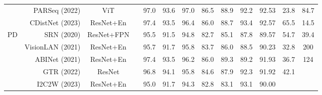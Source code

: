 \documentclass[10pt,journal,compsoc]{IEEEtran}
\begin{document}
\begin{table*}[t]
{\begin{tabular}{c|r|c|c|ccc|ccc|c|cc}
                        & PARSeq  \cite{BautistaA22PARSeq} (2022)  & ViT        &         & 97.0          & 93.6          & 97.0 & 86.5          & 88.9          & 92.2          & 92.53                                                                       & 23.8                                                                    & 84.7     \\
                        & CDistNet  \cite{zheng2023cdistnet} (2023)  & ResNet+En        &         & 97.4          & 93.5          & 96.4 & 86.0          & 88.7          & 93.4          & 92.57                                                                       & 65.5                                                                    & 14.5     \\
\hline
\multirow{6}{*}{PD}     & SRN \cite{yu2020srn} (2020)  & ResNet+FPN     &            & 95.5          & 91.5          & 94.8          & 82.7          & 85.1          & 87.8          & 89.57                                                                       & 54.7                                                                    & 39.4                                                                 \\
                        & VisionLAN \cite{Wang_2021_visionlan} (2021)& ResNet+En       &       & 95.7          & 91.7          & 95.8          & 83.7          & 86.0          & 88.5          & 90.23                                                                       & 32.8                                                                    & 200                                                                    \\
                        & ABINet \cite{TPAMI2022ABINetPP} (2021) & ResNet+En     &           & 97.4          & 93.5          & 96.2          & 86.0          & 89.3          & 89.2          & 91.93                                                                       & 36.7                                                                    & 124                                                               \\
                        & GTR \cite{HeC0LHWD22GTR} (2022) & ResNet       &            & 96.8          & 94.1          & 95.8          & 84.6          & 87.9          & 92.3          & 91.92                                                                       & 42.1                                                                    &    \\
                        & I2C2W \cite{tpami2023I2C2W} (2023) & ResNet+En       &            & 95.0          & 91.7          & 94.3          & 82.8          & 83.1          & 93.1          & 90.00                                                                       &                                                                     & \\

\end{tabular}}
\end{table*}
\end{document}
